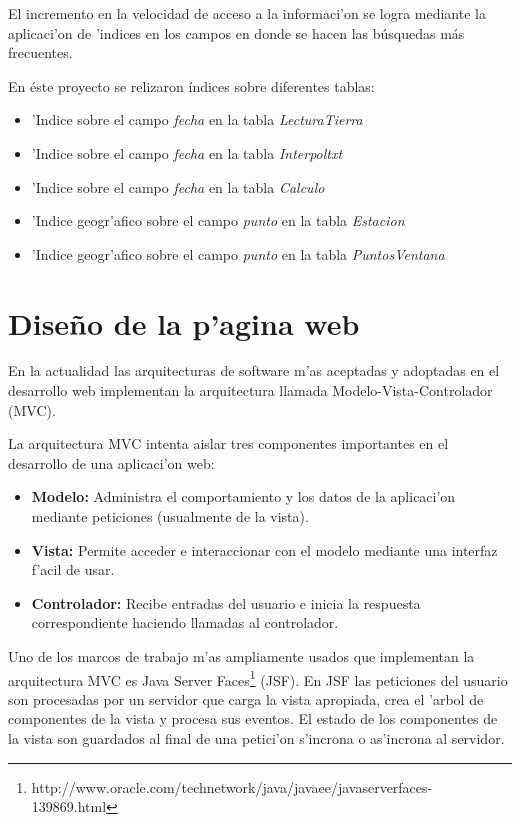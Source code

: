 El incremento en la velocidad de acceso a la informaci'on se logra mediante la aplicaci'on de 'indices en los campos en donde
se hacen las b\'usquedas m\'as frecuentes.

En \'este proyecto se relizaron \'indices sobre diferentes tablas:
\begin{itemize}
 \item 'Indice sobre el campo \textit{fecha} en la tabla \textit{LecturaTierra}  
  \item 'Indice sobre el campo \textit{fecha} en la tabla \textit{Interpoltxt}
  \item 'Indice sobre el campo \textit{fecha} en la tabla \textit{Calculo}
  \item 'Indice geogr'afico sobre el campo \textit{punto} en la tabla \textit{Estacion}
  \item 'Indice geogr'afico sobre el campo \textit{punto} en la tabla \textit{PuntosVentana}
\end{itemize}



\section{Dise\~no de la p'agina web}
En la actualidad las arquitecturas de software m'as aceptadas y adoptadas en 
el desarrollo web implementan la arquitectura llamada Modelo-Vista-Controlador (MVC).

La arquitectura MVC\cite{jsf} intenta aislar tres componentes importantes en el desarrollo
de una aplicaci'on web:

\begin{itemize}
 \item \textbf{Modelo:} Administra el comportamiento y los datos de la aplicaci'on mediante peticiones (usualmente de la vista).
\item \textbf{Vista:} Permite acceder e interaccionar con el modelo mediante una interfaz f'acil de usar.
\item \textbf{Controlador: } Recibe entradas del usuario e inicia la respuesta correspondiente haciendo llamadas al controlador.
\end{itemize}

Uno de los marcos de trabajo m'as ampliamente usados que implementan la arquitectura MVC es Java Server Faces\footnote{http://www.oracle.com/technetwork/java/javaee/javaserverfaces-139869.html}
 (JSF). En JSF las peticiones del usuario son procesadas por un servidor que carga la vista apropiada, crea el 'arbol de componentes de la vista y
procesa sus eventos. El estado de los componentes de la vista son guardados al final de una petici'on s'incrona o as'incrona al servidor.

